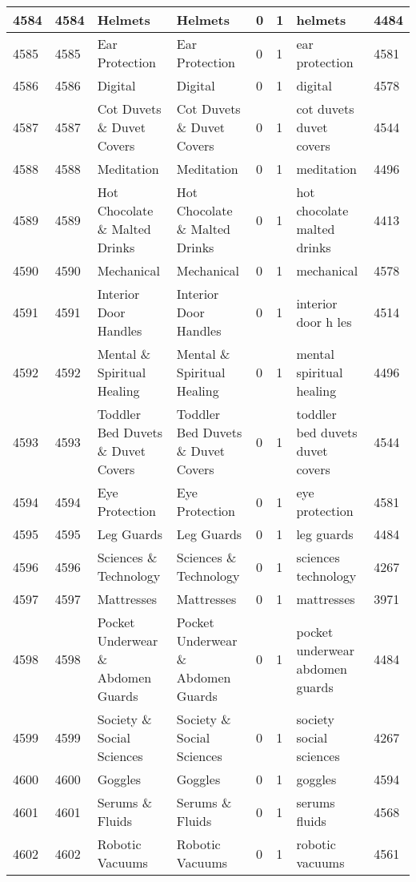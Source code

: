 \begin{longtable}{|l|l|l|l|l|l|l|l|}
4584 & 4584 & Helmets & Helmets & 0 & 1 & helmets & 4484 \\ \hline 
4585 & 4585 & Ear Protection & Ear Protection & 0 & 1 & ear protection & 4581 \\ \hline 
4586 & 4586 & Digital & Digital & 0 & 1 & digital & 4578 \\ \hline 
4587 & 4587 & Cot Duvets \& Duvet Covers & Cot Duvets \& Duvet Covers & 0 & 1 & cot duvets duvet covers & 4544 \\ \hline 
4588 & 4588 & Meditation & Meditation & 0 & 1 & meditation & 4496 \\ \hline 
4589 & 4589 & Hot Chocolate \& Malted Drinks & Hot Chocolate \& Malted Drinks & 0 & 1 & hot chocolate malted drinks & 4413 \\ \hline 
4590 & 4590 & Mechanical & Mechanical & 0 & 1 & mechanical & 4578 \\ \hline 
4591 & 4591 & Interior Door Handles & Interior Door Handles & 0 & 1 & interior door h les & 4514 \\ \hline 
4592 & 4592 & Mental \& Spiritual Healing & Mental \& Spiritual Healing & 0 & 1 & mental spiritual healing & 4496 \\ \hline 
4593 & 4593 & Toddler Bed Duvets \& Duvet Covers & Toddler Bed Duvets \& Duvet Covers & 0 & 1 & toddler bed duvets duvet covers & 4544 \\ \hline 
4594 & 4594 & Eye Protection & Eye Protection & 0 & 1 & eye protection & 4581 \\ \hline 
4595 & 4595 & Leg Guards & Leg Guards & 0 & 1 & leg guards & 4484 \\ \hline 
4596 & 4596 & Sciences \& Technology & Sciences \& Technology & 0 & 1 & sciences technology & 4267 \\ \hline 
4597 & 4597 & Mattresses & Mattresses & 0 & 1 & mattresses & 3971 \\ \hline 
4598 & 4598 & Pocket Underwear \& Abdomen Guards & Pocket Underwear \& Abdomen Guards & 0 & 1 & pocket underwear abdomen guards & 4484 \\ \hline 
4599 & 4599 & Society \& Social Sciences & Society \& Social Sciences & 0 & 1 & society social sciences & 4267 \\ \hline 
4600 & 4600 & Goggles & Goggles & 0 & 1 & goggles & 4594 \\ \hline 
4601 & 4601 & Serums \& Fluids & Serums \& Fluids & 0 & 1 & serums fluids & 4568 \\ \hline 
4602 & 4602 & Robotic Vacuums & Robotic Vacuums & 0 & 1 & robotic vacuums & 4561 \\ \hline 

\end{longtable}
